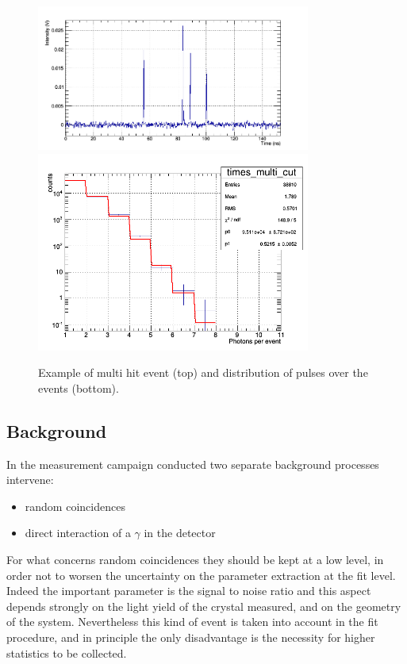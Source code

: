 \begin{figure}
\begin{center}
\includegraphics[width=9cm]{../Pictures/Chapter_8/multi.png}
\includegraphics[width=9cm]{../Pictures/Chapter_8/multi_pois.png}
\end{center}
\caption[Multi hits in $\gamma$ setup]{Example of multi hit event (top) and distribution of pulses over the events (bottom).}
\label{fig:twist1}
\end{figure}
\subsection{Background}
In the measurement campaign conducted two separate background processes intervene:
\begin{itemize}
\item random coincidences
\item direct interaction of a $\gamma$ in the detector
\end{itemize}
For what concerns random coincidences they should be kept at a low level, in order not to worsen the uncertainty on the parameter extraction at the fit level. Indeed the important parameter is the signal to noise ratio and this aspect depends strongly on the light yield of the crystal measured, and on the geometry of the system. Nevertheless this kind of event is taken into account in the fit procedure, and in principle the only disadvantage is the necessity for higher statistics to be collected.


